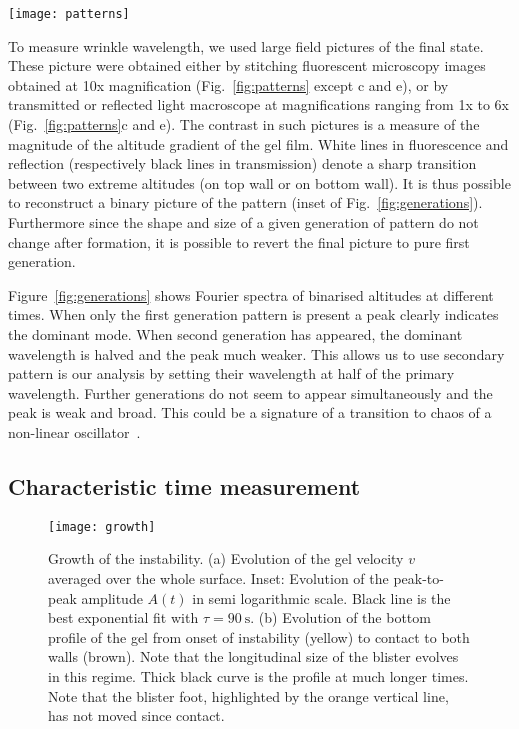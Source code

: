 \documentclass[twocolumn,superscriptaddress,showpacs,preprintnumbers,
amsmath,amssymb,prl]{revtex4-1}
\begin{document}
\begin{figure*}
	\texttt{[image: patterns]}
	\caption{Patterns corresponding to the samples of Table~\ref{tab:data} of the main text. (a-d) increasing cell thickness. (e-f) larger solid content. (g-i) increasing glycerol content. All pictures are stitching of fluorescent microscopy images except (c,e) which are details of reflected light macroscope images. Scale is common to all panels (scale bar \SI{1}{\milli\metre}). Length of arrows correspond to the measured primary wavelength.}
	\label{fig:patterns}
\end{figure*}

To measure wrinkle wavelength, we used large field pictures of the final state. These picture were obtained either by stitching fluorescent microscopy images obtained at 10x magnification (Fig.~\ref{fig:patterns} except c and e), or by transmitted or reflected light macroscope at magnifications ranging from 1x to 6x (Fig.~\ref{fig:patterns}c and e). The contrast in such pictures is a measure of the magnitude of the altitude gradient of the gel film. White lines in fluorescence and reflection (respectively black lines in transmission) denote a sharp transition between two extreme altitudes (on top wall or on bottom wall). It is thus possible to reconstruct a binary picture of the pattern (inset of Fig.~\ref{fig:generations}). Furthermore since the shape and size of a given generation of pattern do not change after formation, it is possible to revert the final picture to pure first generation.

Figure~\ref{fig:generations} shows Fourier spectra of binarised altitudes at different times. When only the first generation pattern is present a peak clearly indicates the dominant mode. When second generation has appeared, the dominant wavelength is halved and the peak much weaker. This allows us to use secondary pattern is our analysis by setting their wavelength at half of the primary wavelength. Further generations do not seem to appear simultaneously and the peak is weak and broad. This could be a signature of a transition to chaos of a non-linear oscillator~\cite{Brau2011}.

\subsection*{Characteristic time measurement}
\begin{figure}
	\texttt{[image: growth]}
	\caption{Growth of the instability. (a) Evolution of the gel velocity $v$ averaged over the whole surface. Inset: Evolution of the peak-to-peak amplitude $A(t)$ in semi logarithmic scale. Black line is the best exponential fit with $\tau=\SI{90}{\second}$. (b) Evolution of the bottom profile of the gel from onset of instability (yellow) to contact to both walls (brown). Note that the longitudinal size of the blister evolves in this regime. Thick black curve is the profile at much longer times. Note that the blister foot, highlighted by the orange vertical line, has not moved since contact.}
	\label{fig:growth}
\end{figure}
\end{document}
